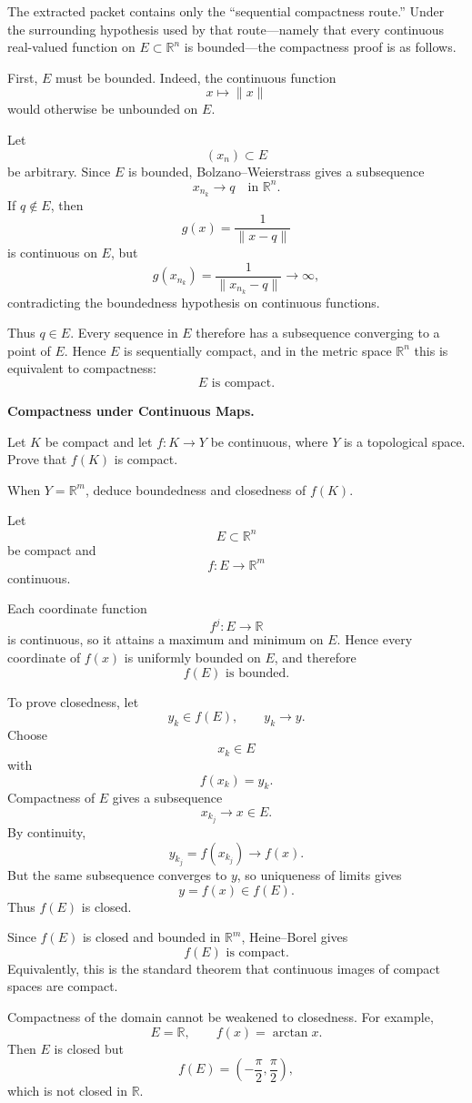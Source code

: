 \begin{solution}
The extracted packet contains only the ``sequential compactness route.'' Under the surrounding hypothesis used by that route---namely that every continuous real-valued function on \(E\subset\mathbb R^n\) is bounded---the compactness proof is as follows.

First, \(E\) must be bounded. Indeed, the continuous function
\[
x\longmapsto\|x\|
\]
would otherwise be unbounded on \(E\).

Let
\[
(x_n)\subset E
\]
be arbitrary. Since \(E\) is bounded, Bolzano--Weierstrass gives a subsequence
\[
x_{n_k}\to q
\quad\text{in }\mathbb R^n.
\]
If \(q\notin E\), then
\[
g(x)=\frac1{\|x-q\|}
\]
is continuous on \(E\), but
\[
g(x_{n_k})
=
\frac1{\|x_{n_k}-q\|}
\longrightarrow\infty,
\]
contradicting the boundedness hypothesis on continuous functions.

Thus \(q\in E\). Every sequence in \(E\) therefore has a subsequence converging to a point of \(E\). Hence \(E\) is sequentially compact, and in the metric space \(\mathbb R^n\) this is equivalent to compactness:
\[
\boxed{E\text{ is compact}.}
\]
\end{solution}


\begin{problem}[CP-II-0326]
\label{prob:cp-ii-0326}
\textbf{Compactness under Continuous Maps.}

\hspace*{1.5em}Let \(K\) be compact and let \(f:K\to Y\) be continuous, where \(Y\) is a
topological space. Prove that \(f(K)\) is compact.

When \(Y=\mathbb R^m\), deduce boundedness and closedness of \(f(K)\).
\end{problem}

\begin{solution}
Let
\[
E\subset\mathbb R^n
\]
be compact and
\[
f:E\to\mathbb R^m
\]
continuous.

Each coordinate function
\[
f^j:E\to\mathbb R
\]
is continuous, so it attains a maximum and minimum on \(E\). Hence every coordinate of \(f(x)\) is uniformly bounded on \(E\), and therefore
\[
\boxed{f(E)\text{ is bounded}.}
\]

To prove closedness, let
\[
y_k\in f(E),
\qquad
y_k\to y.
\]
Choose
\[
x_k\in E
\]
with
\[
f(x_k)=y_k.
\]
Compactness of \(E\) gives a subsequence
\[
x_{k_j}\to x\in E.
\]
By continuity,
\[
y_{k_j}
=
f(x_{k_j})
\longrightarrow
f(x).
\]
But the same subsequence converges to \(y\), so uniqueness of limits gives
\[
y=f(x)\in f(E).
\]
Thus \(f(E)\) is closed.

Since \(f(E)\) is closed and bounded in \(\mathbb R^m\), Heine--Borel gives
\[
\boxed{f(E)\text{ is compact}.}
\]
Equivalently, this is the standard theorem that continuous images of compact spaces are compact.

Compactness of the domain cannot be weakened to closedness. For example,
\[
E=\mathbb R,
\qquad
f(x)=\arctan x.
\]
Then \(E\) is closed but
\[
f(E)=\left(-\frac{\pi}{2},\frac{\pi}{2}\right),
\]
which is not closed in \(\mathbb R\).
\end{solution}


